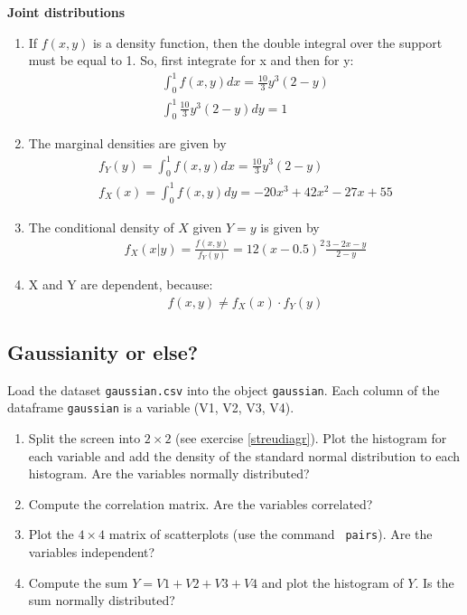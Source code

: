 \documentclass{article}
\begin{document}
\begin{solution}
\textbf{Joint distributions}

\begin{enumerate}
\item If $f(x,y)$ is a density function, then the double integral over
    the support must be equal to 1. So, first integrate for x and then
    for y:
\begin{align*}
\int_0^1 f(x,y) dx = \frac{10}{3} y^3 (2-y)\\
\int_0^1 \frac{10}{3} y^3 (2-y) dy = 1
\end{align*}
\item The marginal densities are given by
\begin{align*}
f_Y(y) = \int_0^1 f(x,y) dx = \frac{10}{3} y^3 (2-y)\\
f_X(x) = \int_0^1 f(x,y) dy = -20 x^3 + 42x^2-27x+55
\end{align*}
\item The conditional density of $X$ given $Y=y$ is given by
\begin{align*}
f_X(x|y) =\frac{f(x,y)}{f_Y(y)} = 12(x-0.5)^2 \frac{3-2x-y}{2-y}
\end{align*}
\item X and Y are dependent, because:
\begin{align*}
f(x,y) \neq f_X(x)\cdot f_Y(y)
\end{align*}
\end{enumerate}
\end{solution}

\subsection{Gaussianity or else?}

\label{gaussianity}

Load the dataset \texttt{gaussian.csv} into the object \texttt{gaussian}. Each
column of the dataframe \texttt{gaussian} is a variable (V1, V2, V3, V4).

\begin{enumerate}
\item Split the screen into $2\times 2$ (see exercise \ref{streudiagr}).
Plot the histogram for each variable and add the density of the standard
normal distribution to each histogram. Are the variables normally
distributed?

\item Compute the correlation matrix. Are the variables correlated?

\item Plot the $4\times 4$ matrix of scatterplots (use the command \texttt{%
pairs}). Are the variables independent?

\item Compute the sum $Y=V1+V2+V3+V4$ and plot the histogram of $Y.$ Is the
sum normally distributed?
\end{enumerate}
\end{document}
